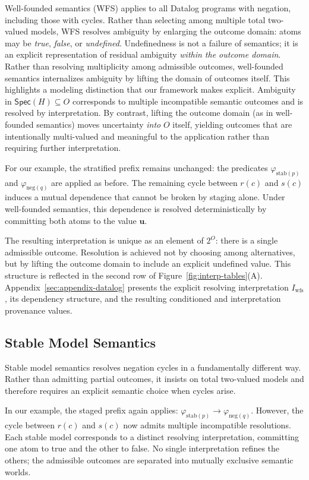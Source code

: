 \documentclass[acmsmall,nonacm]{acmart}
\theoremstyle{remark}
\numberwithin{definition}{section}
\numberwithin{theorem}{section}
\numberwithin{lemma}{section}
\numberwithin{corollary}{section}
\numberwithin{remark}{section}
\numberwithin{example}{section}
\numberwithin{observation}{section}
\numberwithin{assumption}{section}
\newcommand{\Spec}{\mathsf{Spec}}
\begin{document}
Well-founded semantics (WFS) applies to all Datalog programs with negation,
including those with cycles.
Rather than selecting among multiple total two-valued models, WFS resolves
ambiguity by enlarging the outcome domain: atoms may be \emph{true}, \emph{false},
or \emph{undefined}.
Undefinedness is not a failure of semantics; it is an explicit representation of
residual ambiguity \emph{within the outcome domain}.
Rather than resolving multiplicity among admissible outcomes, well-founded
semantics internalizes ambiguity by lifting the domain of outcomes itself.
This highlights a modeling distinction that our framework makes explicit.
Ambiguity in $\Spec(H) \subseteq O$ corresponds to multiple incompatible semantic
outcomes and is resolved by interpretation.
By contrast, lifting the outcome domain (as in well-founded semantics) moves
uncertainty \emph{into} $O$ itself, yielding outcomes that are intentionally
multi-valued and meaningful to the application rather than requiring further
interpretation.

For our example, the stratified prefix remains unchanged: the predicates
$\varphi_{\mathrm{stab}(p)}$ and $\varphi_{\mathrm{neg}(q)}$ are applied as before.
The remaining cycle between $r(c)$ and $s(c)$ induces a mutual dependence that
cannot be broken by staging alone.
Under well-founded semantics, this dependence is resolved deterministically by
committing both atoms to the value $\mathbf{u}$.

The resulting interpretation is unique as an element of $2^O$: there is a single
admissible outcome.
Resolution is achieved not by choosing among alternatives, but by lifting the
outcome domain to include an explicit undefined value.
This structure is reflected in the second row of
Figure~\ref{fig:interp-tables}(A).
Appendix~\ref{sec:appendix-datalog} presents the explicit resolving interpretation
$I_{\mathrm{wfs}}$, its dependency structure, and the resulting conditioned and
interpretation provenance values.

\subsection{Stable Model Semantics}

Stable model semantics resolves negation cycles in a fundamentally different way.
Rather than admitting partial outcomes, it insists on total two-valued models and
therefore requires an explicit semantic choice when cycles arise.

In our example, the staged prefix again applies:
$\varphi_{\mathrm{stab}(p)} \rightarrow \varphi_{\mathrm{neg}(q)}$.
However, the cycle between $r(c)$ and $s(c)$ now admits multiple incompatible
resolutions.
Each stable model corresponds to a distinct resolving interpretation, committing
one atom to true and the other to false.
No single interpretation refines the others; the admissible outcomes are separated
into mutually exclusive semantic worlds.
\end{document}
